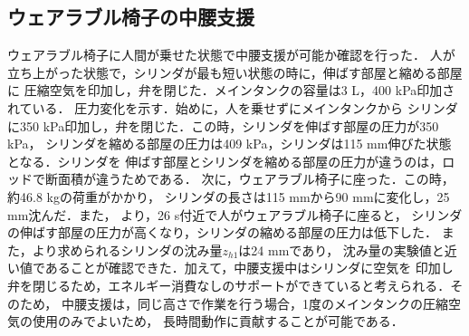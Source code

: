 \subsection{ウェアラブル椅子の中腰支援}
ウェアラブル椅子に人間が乗せた状態で中腰支援が可能か確認を行った．
人が立ち上がった状態で，シリンダが最も短い状態の時に，伸ばす部屋と縮める部屋に
圧縮空気を印加し，弁を閉じた．メインタンクの容量は3 L，400 kPa印加されている．
圧力変化を示す．始めに，人を乗せずにメインタンクから
シリンダに350 kPa印加し，弁を閉じた．この時，シリンダを伸ばす部屋の圧力が350 kPa，
シリンダを縮める部屋の圧力は409 kPa，シリンダは115 mm伸びた状態となる．シリンダを
伸ばす部屋とシリンダを縮める部屋の圧力が違うのは，ロッドで断面積が違うためである．
次に，ウェアラブル椅子に座った．この時，約46.8 kgの荷重がかかり，
シリンダの長さは115 mmから90 mmに変化し，25 mm沈んだ．また，
より，26 s付近で人がウェアラブル椅子に座ると，
シリンダの伸ばす部屋の圧力が高くなり，シリンダの縮める部屋の圧力は低下した．
また，より求められるシリンダの沈み量$z_{h1}$は24 mmであり，
沈み量の実験値と近い値であることが確認できた．加えて，中腰支援中はシリンダに空気を
印加し弁を閉じるため，エネルギー消費なしのサポートができていると考えられる．そのため，
中腰支援は，同じ高さで作業を行う場合，1度のメインタンクの圧縮空気の使用のみでよいため，
長時間動作に貢献することが可能である．
